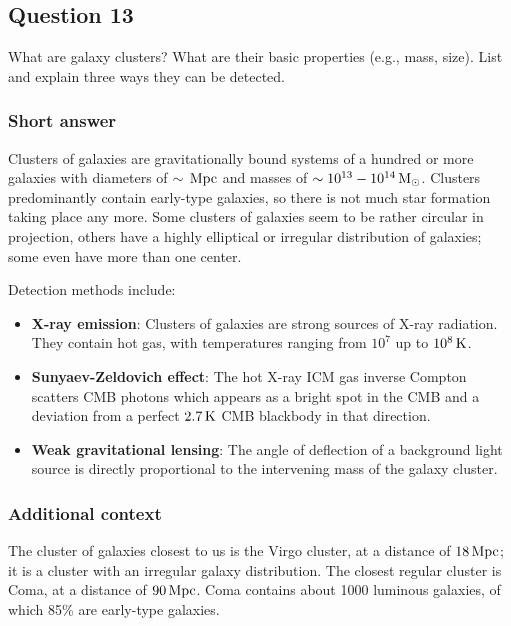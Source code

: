 \documentclass[a4paper,10pt]{article}
\begin{document}

\newpage
\subsection{Question 13}

What are galaxy clusters? What are their basic properties (e.g., mass, size). List and explain three ways they can be detected.

\subsubsection{Short answer}

Clusters of galaxies are gravitationally bound systems of a hundred or more galaxies with diameters of $\sim\,{\rm Mpc}$ and masses of $\sim10^{13}-10^{14}\,{\rm M_\odot}$. Clusters predominantly contain early-type galaxies, so there is not much star formation taking place any more. Some clusters of galaxies seem to be rather circular in projection, others have a highly elliptical or irregular distribution of galaxies; some even have more than one center.

{\noindent}Detection methods include:

\begin{itemize}
    \item \textbf{X-ray emission}: Clusters of galaxies are strong sources of X-ray radiation. They contain hot gas, with temperatures ranging from $10^7$ up to $10^8\,{\rm K}$.
    \item \textbf{Sunyaev-Zeldovich effect}: The hot X-ray ICM gas inverse Compton scatters CMB photons which appears as a bright spot in the CMB and a deviation from a perfect $2.7\,{\rm K}$ CMB blackbody in that direction.
    \item \textbf{Weak gravitational lensing}: The angle of deflection of a background light source is directly proportional to the intervening mass of the galaxy cluster.
\end{itemize}

\subsubsection{Additional context}

The cluster of galaxies closest to us is the Virgo cluster, at a distance of $18\,{\rm Mpc}$; it is a cluster with an irregular galaxy distribution. The closest regular cluster is Coma, at a distance of $90\,{\rm Mpc}$. Coma contains about 1000 luminous galaxies, of which 85\% are early-type galaxies.
\end{document}
